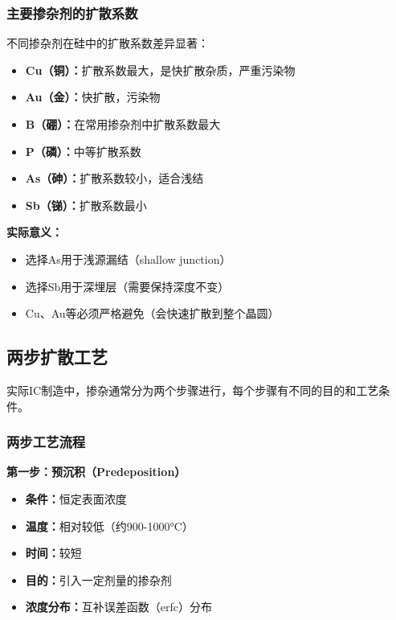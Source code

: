 \documentclass[UTF8,12pt,a4paper]{ctexart}
\begin{document}
\subsubsection{主要掺杂剂的扩散系数}

不同掺杂剂在硅中的扩散系数差异显著：

\begin{itemize}
    \item \textbf{Cu（铜）：}扩散系数最大，是快扩散杂质，严重污染物
    \item \textbf{Au（金）：}快扩散，污染物
    \item \textbf{B（硼）：}在常用掺杂剂中扩散系数最大
    \item \textbf{P（磷）：}中等扩散系数
    \item \textbf{As（砷）：}扩散系数较小，适合浅结
    \item \textbf{Sb（锑）：}扩散系数最小
\end{itemize}

\textbf{实际意义：}
\begin{itemize}
    \item 选择As用于浅源漏结（shallow junction）
    \item 选择Sb用于深埋层（需要保持深度不变）
    \item Cu、Au等必须严格避免（会快速扩散到整个晶圆）
\end{itemize}

\subsection{两步扩散工艺}

实际IC制造中，掺杂通常分为两个步骤进行，每个步骤有不同的目的和工艺条件。

\subsubsection{两步工艺流程}

\textbf{第一步：预沉积（Predeposition）}
\begin{itemize}
    \item \textbf{条件：}恒定表面浓度
    \item \textbf{温度：}相对较低（约900-1000°C）
    \item \textbf{时间：}较短
    \item \textbf{目的：}引入一定剂量的掺杂剂
    \item \textbf{浓度分布：}互补误差函数（erfc）分布
\end{itemize}
\end{document}

